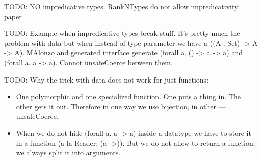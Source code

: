 TODO: NO impredicative types. RankNTypes do not allow impredicativity: paper\cite{SPJ11}

TODO: Example when impredicative types break stuff. It's pretty much the problem with
data but when instead of type parameter we have a ((A : Set) -> A -> A). MAlonzo and
generated interface generate (forall a. () -> a -> a) and (forall a. a -> a). Cannot
unsafeCoerce between them.

TODO: Why the trick with data does not work for just functions:
\begin{itemize}
\item One polymorphic and one specialized function. One puts a thing in. The other
      gets it out. Therefore in one way we use bijection, in other --- unsafeCoerce.
\item When we do not hide (forall a. a -> a) inside a datatype we have to store it
      in a function (a la Reader: (a ->)). But we do not allow to return a function:
      we always split it into arguments.
\end{itemize}
